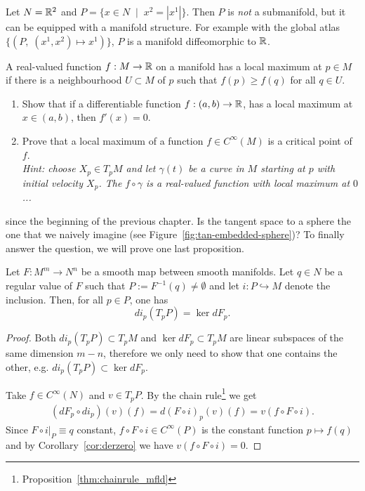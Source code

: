 \begin{example}
  Let $N = \mathbb{R}^2$ and $P = \{ x\in N \;\mid\; x^2 = |x^1| \}$.
  Then $P$ is \emph{not} a submanifold, but it can be equipped with a manifold structure.
  For example with the global atlas $\{(P,\; (x^1,x^2)\mapsto x^1)\}$, $P$ is a manifold diffeomorphic to $\mathbb{R}$.
\end{example}

\begin{exercise}
  A real-valued function $f:M\to\mathbb{R}$ on a manifold has a local maximum at $p\in M$ if there is a neighbourhood $U\subset M$ of $p$ such that $f(p) \geq f(q)$ for all $q\in U$.
  \begin{enumerate}
    \item Show that if a differentiable function $f:(a,b)\to\mathbb{R}$, has a local maximum at $x\in (a,b)$, then $f'(x) = 0$.
    \item Prove that a local maximum of a function $f\in C^\infty(M)$ is a critical point of $f$.\\
          \textit{\small Hint: choose $X_p\in T_pM$ and let $\gamma(t)$ be a curve in $M$ starting at $p$ with initial velocity $X_p$. The $f\circ \gamma$ is a real-valued function with local maximum at $0$...}
  \end{enumerate}
\end{exercise}

 since the beginning of the previous chapter.
Is the tangent space to a sphere the one that we naively imagine (see Figure~\ref{fig:tan-embedded-sphere})?
To finally answer the question, we will prove one last proposition.

\begin{proposition}
  Let $F:M^m\to N^n$ be a smooth map between smooth manifolds.
  Let $q\in N$ be a regular value of $F$ such that $P:=F^{-1}(q)\neq\emptyset$ and let $i:P\hookrightarrow M$ denote the inclusion.
  Then, for all $p\in P$, one has
  \begin{equation}
    d i_p(T_p P) = \ker dF_p.
  \end{equation}
\end{proposition}
\begin{proof}
  Both $d i_p(T_p P)\subset T_p M$ and $\ker dF_p \subset T_p M$ are linear subspaces of the same dimension $m-n$, therefore we only need to show that one contains the other, e.g. $d i_p(T_p P) \subset \ker dF_p$.

  Take $f\in C^\infty(N)$ and $v\in T_p P$. By the chain rule\footnote{Proposition~\ref{thm:chainrule_mfld}} we get
  \begin{align}
    (d F_p \circ d i_p)(v)(f) = d(F\circ i)_p(v)(f) = v(f\circ F\circ i).
  \end{align}
  Since $F\circ i\big|_{P} \equiv q$ constant, $f\circ F\circ i\in C^\infty(P)$ is the constant function $p \mapsto f(q)$ and by Corollary~\ref{cor:derzero} we have $v(f\circ F\circ i)=0$.
\end{proof}

